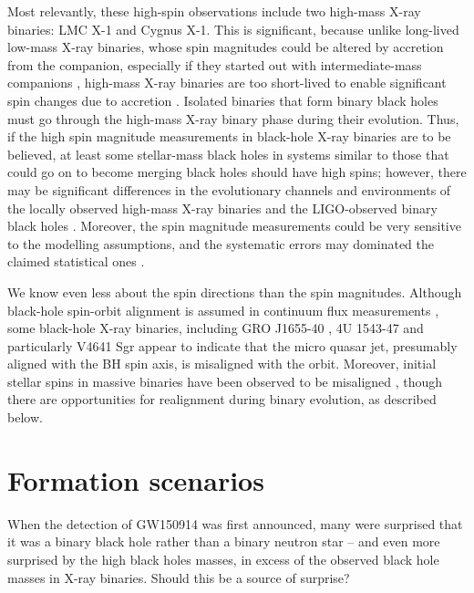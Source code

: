 \documentclass[iop,onecolumn]{revtex4}
\begin{document}
Most relevantly, these high-spin observations include two high-mass X-ray binaries: LMC X-1 and Cygnus X-1.  This is significant, because unlike long-lived low-mass X-ray binaries, whose spin magnitudes could be altered by accretion from the companion, especially if they started out with intermediate-mass companions \citep{Podsiadlowski:2003,Fragos:2015}, high-mass X-ray binaries are too short-lived to enable significant spin changes due to accretion \citep{KingKolb:1999}.  %
Isolated binaries that form binary black holes must go through the high-mass X-ray binary phase during their evolution.  Thus, if the high spin magnitude measurements in black-hole X-ray binaries are to be believed, at least some stellar-mass black holes in systems similar to those that could go on to become merging black holes should have high spins; however, there may be significant differences in the evolutionary channels and environments of the locally observed high-mass X-ray binaries and the LIGO-observed binary black holes \citep{HotokezakaPiran:2017}.  Moreover, the spin magnitude measurements could be very sensitive to the modelling assumptions, and the systematic errors may dominated the claimed statistical ones \citep[e.g.,][]{Basak:2017,Kawano:2017}.

We know even less about the spin directions than the spin magnitudes.  Although black-hole spin-orbit alignment is assumed in continuum flux measurements \citep{MillerMiller:2015}, some black-hole X-ray binaries, including GRO J1655-40 \citep{Martin:2008}, 4U 1543-47 \citep{MorningstarMiller:2014} and particularly V4641 Sgr \citep{Orosz:2001,Martin:2008b} appear to indicate that the micro
quasar jet, presumably aligned with the BH spin axis, is misaligned with the orbit.  Moreover, initial stellar spins in massive binaries have been observed to be misaligned \citep[e.g.,][]{Albrecht:2009,Albrecht:2014}, though there are opportunities for realignment during binary evolution, as described below.

\section{Formation scenarios}\label{form}

When the detection of GW150914 was first announced, many were surprised that it was a binary black hole rather than a binary neutron star -- and even more surprised by the high black holes masses, in excess of the observed black hole masses in X-ray binaries.  Should this be a source of surprise?
\end{document}
